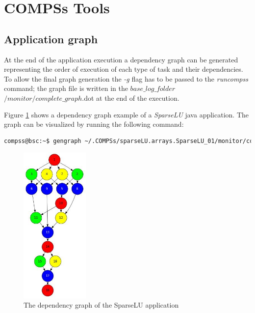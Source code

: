 \section{COMPSs Tools}
\label{sec:Tools}

\subsection{Application graph}
At the end of the application execution a dependency graph can be generated representing the order of execution of each type of 
task and their dependencies. To allow the final graph generation the \textit{-g} flag has to be passed to the \textit{runcompss} command; the graph file is written in the \textit{$base\_log\_folder$}$/monitor/complete\_graph$.dot at the end of the execution.

Figure \ref{fig:complete_graph} shows a dependency graph example of a \textit{SparseLU} java application. The graph can be
visualized by running the following command:
\begin{lstlisting}[language=bash]
compss@bsc:~$ gengraph ~/.COMPSs/sparseLU.arrays.SparseLU_01/monitor/complete_graph.dot
\end{lstlisting}

\begin{figure}[h!]
  \centering
    \includegraphics[width=0.3\textwidth]{./Sections/4_Tools/Figures/dependency_graph.jpeg}
    \caption{The dependency graph of the SparseLU application}
    \label{fig:complete_graph}
\end{figure}



